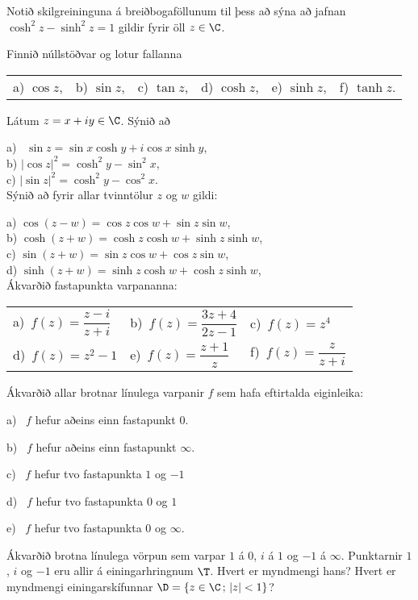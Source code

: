 \daemi Notið skilgreininguna á breiðbogaföllunum til þess að sýna
að  jafnan $\cosh^2 z-\sinh^2 z=1$ gildir fyrir öll $z\in \C$.


\daemi Finnið núllstöðvar og lotur fallanna

\smallskip\noindent
\begin{tabular}{llllll}
 a) $\cos z$, 
&b) $\sin z$,
&c) $\tan z$,
&d) $\cosh z$, 
&e) $\sinh z$,
&f) $\tanh z$.\\
\end{tabular}

\daemi Látum $z=x+iy\in \C$.  Sýnið  að

\smallskip\noindent
a)  \ $\sin z=\sin x\cosh y+i\cos x \sinh y$,\\
b) $|\cos z|^2=\cosh^2y-\sin^2 x$,\\
c)  $|\sin z|^2=\cosh^2y-\cos^2 x$.\\



\daemi Sýnið að fyrir allar tvinntölur $z$ og $w$ gildi:

\smallskip\noindent
a)  $\cos(z-w)=\cos z\cos w+\sin z \sin w$,\\
b)  $\cosh(z+w)=\cosh z\cosh w+\sinh z \sinh w$,\\
c)  $\sin(z+w)=\sin z\cos w+\cos z \sin w$,\\
d)  $\sinh(z+w)=\sinh z\cosh w+\cosh z \sinh w$,\\


\daemi Ákvarðið fastapunkta varpananna:

\smallskip
\begin{tabular}{lll}
a)\ $f(z)=\dfrac{z-i}{z+i}$  &
b)\ $f(z)=\dfrac{3z+4}{2z-1}$  &
c)\ $f(z)=z^4$  \\
d)\ $f(z)=z^2-1$&
e)\ $f(z)=\dfrac{z+1}{z}$  &
f)\ $f(z)=\dfrac{z}{z+i}$
\end{tabular}


\daemi Ákvarðið allar brotnar línulega varpanir $f$ sem hafa eftirtalda
eiginleika:

\smallskip
a) \ $f$ hefur aðeins einn fastapunkt $0$.

\smallskip
b) \ $f$ hefur aðeins einn fastapunkt $\infty$.

\smallskip
c) \ $f$ hefur tvo fastapunkta $1$ og $-1$

\smallskip
d) \ $f$ hefur tvo fastapunkta $0$ og $1$

\smallskip
e) \ $f$ hefur tvo fastapunkta $0$ og $\infty$.

\daemi  Ákvarðið brotna línulega vörpun  sem varpar $1$ á $0$,
$i$ á $1$ og $-1$ á $\infty$.  Punktarnir $1$, $i$ og $-1$ eru allir á
einingarhringnum $\T$.  Hvert er myndmengi hans?  Hvert er myndmengi 
einingarskífunnar $\D=\{z\in \C\,;\, |z|<1\}$?

